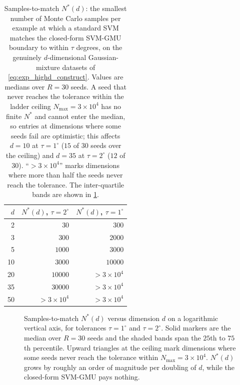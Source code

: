 \documentclass[11pt, letterpaper]{article}
\begin{document}
\begin{table}[H]
    \centering
    \caption{Samples-to-match $N^\ast(d)$: the smallest number of Monte Carlo samples per example at which a standard SVM matches the closed-form SVM-GMU boundary to within $\tau$ degrees, on the genuinely $d$-dimensional Gaussian-mixture datasets of \cref{eq:exp_highd_construct}. Values are medians over $R = 30$ seeds. A seed that never reaches the tolerance within the ladder ceiling $N_{\max} = 3\times10^4$ has no finite $N^\ast$ and cannot enter the median, so entries at dimensions where some seeds fail are optimistic; this affects $d = 10$ at $\tau = 1^\circ$ ($15$ of $30$ seeds over the ceiling) and $d = 35$ at $\tau = 2^\circ$ ($12$ of $30$). ``$>3\times10^4$'' marks dimensions where more than half the seeds never reach the tolerance. The inter-quartile bands are shown in \cref{fig:exp_high_dim_nstar}.}
    \label{tab:exp_high_dim}
    \begin{tabular}{@{}rrr@{}}
        \toprule
        $d$ & $N^\ast(d)$, $\tau = 2^\circ$ & $N^\ast(d)$, $\tau = 1^\circ$ \\
        \midrule
        2  & $30$           & $300$          \\
        3  & $300$          & $2000$         \\
        5  & $1000$         & $3000$         \\
        10 & $3000$         & $10000$        \\
        20 & $10000$        & $>3\times10^4$ \\
        35 & $30000$        & $>3\times10^4$ \\
        50 & $>3\times10^4$ & $>3\times10^4$ \\
        \bottomrule
    \end{tabular}
\end{table}

\begin{figure}[H]
    \centering
    \resizebox{0.75\textwidth}{!}{}
    \caption{Samples-to-match $N^\ast(d)$ versus dimension $d$ on a logarithmic vertical axis, for tolerances $\tau = 1^\circ$ and $\tau = 2^\circ$. Solid markers are the median over $R = 30$ seeds and the shaded bands span the $25$th to $75$th percentile. Upward triangles at the ceiling mark dimensions where some seeds never reach the tolerance within $N_{\max} = 3\times10^4$. $N^\ast(d)$ grows by roughly an order of magnitude per doubling of $d$, while the closed-form SVM-GMU pays nothing.}
    \label{fig:exp_high_dim_nstar}
\end{figure}
\end{document}
